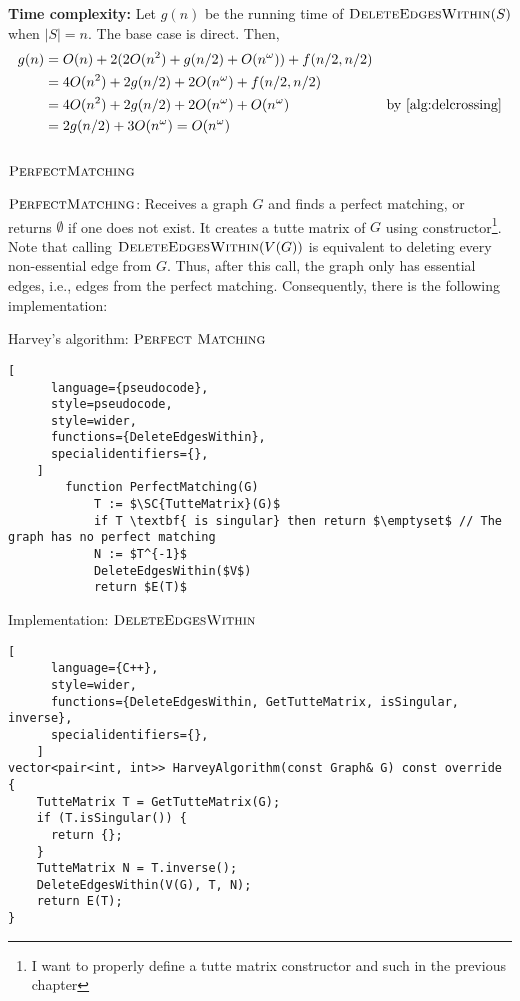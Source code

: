 \textbf{Time complexity:} 
Let \(g(n)\) be the running time of \(\textsc{DeleteEdgesWithin}(S)\) when \(|S| = n\).
The base case is direct.
Then, 
\begin{align}
    g(n) &= O(n) + 2 (2O(n^2) + g(n / 2) + O(n^\omega)) + f(n / 2, n / 2) &  \\
    &= 4O(n^2) + 2g(n / 2) + 2O(n^\omega) + f(n / 2, n / 2) & \\ 
    &= 4O(n^2) + 2g(n / 2) + 2O(n^\omega) + O(n^\omega) & \text{by \ref{alg:delcrossing}} \\ 
    &= 2g(n / 2) + 3O(n^\omega) = O(n^\omega) & \label{alg:delwithin}
\end{align}

\subsection{\(\SC{PerfectMatching}\)}

\(\SC{PerfectMatching}\): Receives a graph \(G\) and finds a perfect matching, or returns \(\emptyset\) if one does not exist.
It creates a tutte matrix of \(G\) using constructor\footnote{I want to properly define a tutte matrix constructor and such in the previous chapter}.
Note that calling \(\textsc{DeleteEdgesWithin}(V(G))\) is equivalent to deleting every non-essential edge from \(G\).
Thus, after this call, the graph only has essential edges, i.e., edges from the perfect matching. 
Consequently, there is the following implementation:

\begin{programruledcaption}{Harvey's algorithm: \(\SC{Perfect Matching}\)}
    \begin{lstlisting}[
      language={pseudocode},
      style=pseudocode,
      style=wider,
      functions={DeleteEdgesWithin},
      specialidentifiers={},
    ]
        function PerfectMatching(G)
            T := $\SC{TutteMatrix}(G)$
            if T \textbf{ is singular} then return $\emptyset$ // The graph has no perfect matching
            N := $T^{-1}$
            DeleteEdgesWithin($V$)
            return $E(T)$
    \end{lstlisting}
\end{programruledcaption}

\begin{programruledcaption}{Implementation: \(\textsc{DeleteEdgesWithin}\)}
    \begin{lstlisting}[
      language={C++},
      style=wider,
      functions={DeleteEdgesWithin, GetTutteMatrix, isSingular, inverse},
      specialidentifiers={},
    ]
vector<pair<int, int>> HarveyAlgorithm(const Graph& G) const override {
    TutteMatrix T = GetTutteMatrix(G);
    if (T.isSingular()) {
      return {};
    }
    TutteMatrix N = T.inverse();
    DeleteEdgesWithin(V(G), T, N);
    return E(T);
}
    \end{lstlisting}
\end{programruledcaption}

